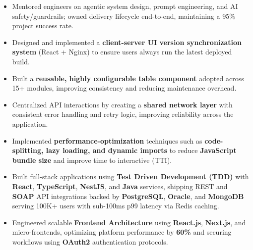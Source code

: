 \documentclass[a4paper]{article}
\begin{document}
\begin{itemize}
\item {Mentored engineers on agentic system design, prompt engineering, and AI safety/guardrails; owned delivery lifecycle end-to-end, maintaining a 95\% project success rate.}
\item  {Designed and implemented a \textbf{client-server UI version synchronization system} (React + Nginx) to ensure users always run the latest deployed build.}
\item  {Built a \textbf{reusable, highly configurable table component} adopted across 15+ modules, improving consistency and reducing maintenance overhead.}
\item {Centralized API interactions by creating a \textbf{shared network layer} with consistent error handling and retry logic, improving reliability across the application.}
\item {Implemented \textbf{performance-optimization} techniques such as \textbf{code-splitting, lazy loading, and dynamic imports} to reduce \textbf{JavaScript bundle size} and improve time to interactive (TTI).}
\item {Built full-stack applications using \textbf{Test Driven Development (TDD)} with \textbf{React}, \textbf{TypeScript}, \textbf{NestJS}, and \textbf{Java} services, shipping REST and \textbf{SOAP} API integrations backed by \textbf{PostgreSQL}, \textbf{Oracle}, and \textbf{MongoDB} serving 100K+ users with sub-100ms p99 latency via Redis caching.}
\item {Engineered scalable \textbf{Frontend Architecture} using \textbf{React.js}, \textbf{Next.js}, and micro-frontends, optimizing platform performance by \textbf{60\%} and securing workflows using \textbf{OAuth2} authentication protocols.}
\end{itemize}
\end{document}
